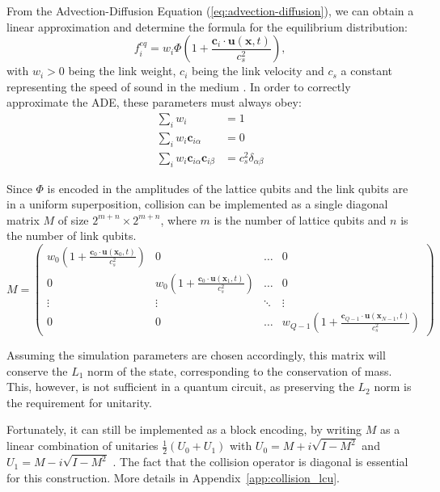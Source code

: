 From the Advection-Diffusion Equation (\ref{eq:advection-diffusion}), we can obtain a linear approximation and determine the formula for the equilibrium distribution:
\begin{equation*}
    f_i^{eq} = w_i \Phi \left( 1 + \frac{\mathbf{c}_i \cdot \mathbf{u}(\mathbf{x},t)}{c_s^2} \right),
\end{equation*}
with $w_i>0$ being the link weight, $c_i$ being the link velocity and $c_s$ a constant representing the speed of sound in the medium \cite{kruger2016lattice}.
In order to correctly approximate the ADE, these parameters must always obey:
\begin{align*}
    \sum_{i} w_i &= 1 \\
    \sum_{i} w_i \mathbf{c}_{i\alpha} &= 0 \\
    \sum_{i} w_i \mathbf{c}_{i\alpha} \mathbf{c}_{i\beta} &= c_s^2 \delta_{\alpha\beta}
\end{align*}

Since $\Phi$ is encoded in the amplitudes of the lattice qubits and the link qubits are in a uniform superposition, collision can be implemented as a single diagonal matrix $M$ of size $2^{m+n} \times 2^{m+n}$, where $m$ is the number of lattice qubits and $n$ is the number of link qubits.
\begin{equation*}
    M = \begin{pmatrix} 
    w_0 \left( 1 + \frac{\mathbf{c}_0 \cdot \mathbf{u}(\mathbf{x}_0,t)}{c_s^2} \right) & 0 & \dots & 0 \\
    0 & w_0 \left( 1 + \frac{\mathbf{c}_0 \cdot \mathbf{u}(\mathbf{x}_1,t)}{c_s^2} \right) & \dots & 0 \\
    \vdots & \vdots & \ddots & \vdots \\
    0 & 0 & \dots & w_{Q-1} \left( 1 + \frac{\mathbf{c}_{Q-1} \cdot \mathbf{u}(\mathbf{x}_{N-1},t)}{c_s^2} \right) 
    \end{pmatrix}
\end{equation*}

Assuming the simulation parameters are chosen accordingly, this matrix will conserve the $L_1$ norm of the state, corresponding to the conservation of mass.
This, however, is not sufficient in a quantum circuit, as preserving the $L_2$ norm is the requirement for unitarity.

Fortunately, it can still be implemented as a block encoding, by writing
$M$ as a linear combination of unitaries $\frac{1}{2}(U_0 + U_1)$ with $U_0 = M + i\sqrt{I - M^2}$ and $U_1 = M - i\sqrt{I - M^2}$ \cite{low2019hamiltonian}.
The fact that the collision operator is diagonal is essential for this construction. More details in Appendix~\ref{app:collision_lcu}.

